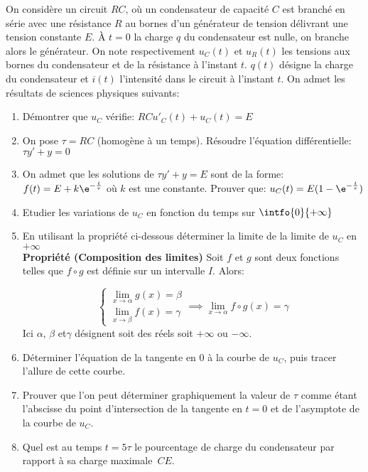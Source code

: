 \begin{exercice}
On consid\`ere un circuit $RC$, o\`u un condensateur de capacit\'e $C$
est branch\'e en s\'erie avec une r\'esistance $R$ au bornes d'un
g\'en\'erateur de tension d\'elivrant une tension constante $E$. \`A
$t=0$ la charge $q$ du condensateur est nulle, on branche alors le
g\'en\'erateur. On note respectivement $u_C(t)$ et $u_R(t)$ les tensions aux bornes du
condensateur et de la r\'esistance \`a l'instant $t$. $q(t)$ d\'esigne la
charge du condensateur et $i(t)$ l'intensit\'e dans le circuit \`a
l'instant $t$. On admet les r\'esultats de sciences physiques suivants:

\begin{enumerate}
\item D\'emontrer que $u_C$ v\'erifie: $RCu'_C(t)+u_C(t)=E$ 

\item On pose $\tau=RC$ (homog\`ene \`a un temps). R\'esoudre l'\'equation diff\'erentielle:
  $\tau y'+y=0$

\item  On admet que les solutions de $\tau y'+y=E$ sont de la forme:
  $f(t)=E+k\e^{-\frac{t}{\tau}}$ o\`u $k$ est une
  constante. Prouver que: $u_C(t)=E(1-\e^{-\frac{t}{\tau}})$

\item Etudier les variations de $u_C$ en fonction du temps sur $\intfo{0}{+\infty}$
\item En utilisant la propri\'et\'e ci-dessous d\'eterminer la limite
  de la limite de $u_C$ en $+\infty$\\
\textbf{Propri\'et\'e (Composition des limites)} Soit $f$ et $g$ sont
deux fonctions telles que $f\circ g$ est d\'efinie sur un intervalle
$I$. Alors:

\[\left\{
\begin{array}{ll}
  \lim_{x\to\alpha}g(x)=\beta\\
\lim_{x\to\beta}f(x)=\gamma
\end{array}
\right. \implies \lim_{x\to\alpha}f\circ g(x)=\gamma \]
Ici $\alpha$, $\beta$ et$\gamma$ d\'esignent soit des r\'eels soit
$+\infty$ ou $-\infty$.

\item D\'eterminer l'\'equation de la tangente en $0$ \`a la courbe de
  $u_C$, puis tracer l'allure de cette courbe.

\item  Prouver que l'on peut d\'eterminer  graphiquement la valeur de $\tau$ comme \'etant l'abscisse du point  d'intersection de la tangente en $t=0$ et de l'asymptote de la  courbe de $u_C$. 

\item Quel est au temps $t=5\tau$ le pourcentage de charge du condensateur par rapport \`a sa charge
  maximale~$CE$. 

\end{enumerate}
 
\end{exercice}
